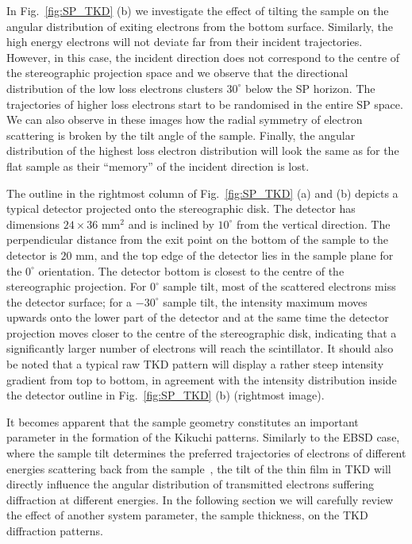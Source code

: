 In Fig.~\ref{fig:SP_TKD} (b) we investigate the effect of tilting the sample on the angular distribution of exiting electrons from the bottom surface. Similarly, the high energy electrons will not deviate far from their incident trajectories. However, in this case, the incident direction does not correspond to the centre of the stereographic projection space and we observe that the directional distribution of the low loss electrons clusters  $30^{\circ}$ below the SP horizon. The trajectories of higher loss electrons start to be randomised in the entire SP space. We can also observe in these images how the radial symmetry of electron scattering is broken by the tilt angle of the sample. Finally, the angular distribution of the highest loss electron distribution will look the same as for the flat sample as their ``memory'' of the incident direction is lost.


The outline in the rightmost column of Fig.~\ref{fig:SP_TKD} (a) and (b) depicts a typical detector projected onto the stereographic disk.  The detector has dimensions $24\times 36$ mm$^2$ and is inclined by $10^{\circ}$ from the vertical direction.  The perpendicular distance from the exit point on the bottom of the sample to the detector is $20$ mm, and the top edge of the detector lies in the sample plane for the $0^{\circ}$ orientation.  The detector bottom is closest to the centre of the stereographic projection.  For $0^{\circ}$ sample tilt, most of the scattered electrons miss the detector surface; for a $-30^{\circ}$ sample tilt, the intensity maximum moves upwards onto the lower part of the detector and at the same time the detector projection moves closer to the centre of the stereographic disk, indicating that a significantly larger number of electrons will reach the scintillator.  It should also be noted that a typical raw TKD pattern will display a rather steep intensity gradient from top to bottom, in agreement with the intensity distribution inside the detector outline in Fig.~\ref{fig:SP_TKD} (b) (rightmost image).



It becomes apparent that the sample geometry constitutes an important parameter in the formation of the Kikuchi patterns. Similarly to the EBSD case, where the sample tilt determines the preferred trajectories of electrons of different energies scattering back from the sample~\cite{degraef2013e}, the tilt of the thin film in TKD will directly influence the angular distribution of transmitted electrons suffering diffraction at different energies. In the following section we will carefully review the effect of another system parameter, the sample thickness, on the TKD diffraction patterns. 
 
